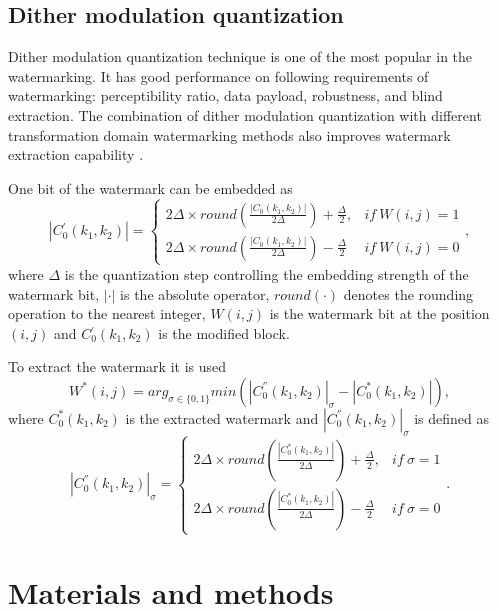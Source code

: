 \documentclass[runningheads]{llncs}
\begin{document}
\subsection*{Dither modulation quantization}
Dither modulation quantization technique is one of the most popular in the watermarking. It has good performance on following requirements of watermarking: perceptibility ratio, data payload, robustness, and blind extraction. The combination of dither modulation quantization with different transformation domain watermarking methods also improves watermark extraction capability \cite{chen2001quantization}. 

	One bit of the watermark can be embedded as
\begin{equation}
|C{}_{0}^{'}(k_{1},k_{2})|=\begin{cases}
2\Delta\times round(\frac{|C{}_{0}(k_{1},k_{2})|}{2\Delta})+\frac{\Delta}{2}, & if\:W(i,j)=1\\
2\Delta\times round(\frac{|C{}_{0}(k_{1},k_{2})|}{2\Delta})-\frac{\Delta}{2} & if\:W(i,j)=0
\end{cases},
\label{DMEm}
\end{equation}
where $\Delta$ is the quantization step controlling the embedding strength of the watermark bit, $|\cdot|$ is the absolute operator, $round(\cdot)$ denotes the rounding operation to the nearest integer, $W(i,j)$ is the watermark bit at the position $(i,j)$ and $C{}_{0}^{'}(k_{1},k_{2})$ is the modified block.

	To extract the watermark it is used
\begin{equation}
W^{*}(i,j)=arg_{\sigma\in\{0,1\}}min(|C_{0}^{''}(k_{1},k_{2})|_{\sigma}-|C_{0}^{*}(k_{1},k_{2})|)
\label{DMEx},
\end{equation}
where $C_{0}^{*}(k_{1},k_{2})$ is the extracted watermark and $|C_{0}^{''}(k_{1},k_{2})|_{\sigma}$ is defined as
\begin{equation}
|C_{0}^{''}(k_{1},k_{2})|_{\sigma}=\begin{cases}
2\Delta\times round(\frac{|C_{0}^{*}(k_{1},k_{2})|}{2\Delta})+\frac{\Delta}{2}, & if\:\sigma=1\\
2\Delta\times round(\frac{|C_{0}^{*}(k_{1},k_{2})|}{2\Delta})-\frac{\Delta}{2} & if\:\sigma=0
\end{cases}.
\end{equation}
\section{Materials and methods}\label{metodos}
\end{document}
